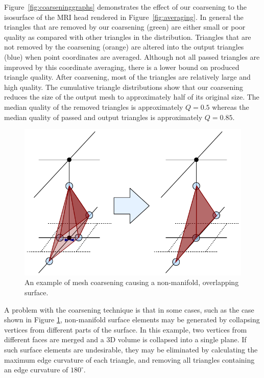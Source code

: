 \documentclass[10pt,journal,cspaper,compsoc]{IEEEtran}
\begin{document}
Figure~\ref{fig:coarseninggraphs} demonstrates the effect of our coarsening
to the isosurface of the MRI head rendered in Figure~\ref{fig:averaging}.
In general the triangles that are removed by our coarsening (green) are
either small or poor quality as compared with other triangles in the
distribution. Triangles that are not removed by the coarsening (orange) are
altered into the output triangles (blue) when point coordinates are
averaged. Although not all passed triangles are improved by this coordinate
averaging, there is a lower bound on produced triangle quality. After
coarsening, most of the triangles are relatively large and high quality.
The cumulative triangle distributions show that our coarsening reduces the
size of the output mesh to approximately half of its original size. The
median quality of the removed triangles is approximately $Q=0.5$ whereas
the median quality of passed and output triangles is approximately
$Q=0.85$.

\begin{figure}[htb]
\includegraphics[width=\columnwidth]{Nonmanifold.pdf}
\caption{An example of mesh coarsening causing a non-manifold, overlapping
  surface.}
\label{fig:Nonmanifold}
\end{figure}

A problem with the coarsening technique is that in some cases, such as the
case shown in Figure \ref{fig:Nonmanifold}, non-manifold surface elements
may be generated by collapsing vertices from different parts of the
surface. In this example, two vertices from different faces are merged and
a 3D volume is collapsed into a single plane.  If such surface elements are
undesirable, they may be eliminated by calculating the maximum edge
curvature of each triangle, and removing all triangles containing an edge
curvature of $180^{\circ}$.
\end{document}
